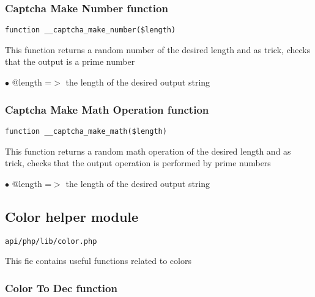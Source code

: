 \documentclass[a4paper]{article}
\begin{document}
\hypertarget{toc393}{}
\subsubsection{Captcha Make Number function}

\begin{lstlisting}
function __captcha_make_number($length)
\end{lstlisting}

This function returns a random number of the desired length and as trick,
checks that the output is a prime number

\begin{compactitem}
\item[\color{myblue}$\bullet$] @length =$>$ the length of the desired output string
\end{compactitem}

\hypertarget{toc394}{}
\subsubsection{Captcha Make Math Operation function}

\begin{lstlisting}
function __captcha_make_math($length)
\end{lstlisting}

This function returns a random math operation of the desired length and
as trick, checks that the output operation is performed by prime numbers

\begin{compactitem}
\item[\color{myblue}$\bullet$] @length =$>$ the length of the desired output string
\end{compactitem}

\hypertarget{toc395}{}
\subsection{Color helper module}

\begin{lstlisting}
api/php/lib/color.php
\end{lstlisting}

This fie contains useful functions related to colors

\hypertarget{toc396}{}
\subsubsection{Color To Dec function}
\end{document}
